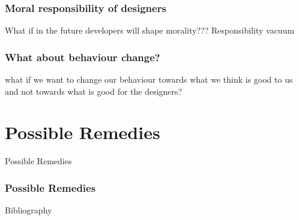 \documentclass{beamer}
\begin{document}
\begin{frame}
	\frametitle{Moral responsibility of designers}
	What if in the future developers will shape morality??? Responsibility vacuum	
\end{frame}

\begin{frame}
\frametitle{What about behaviour change?}
what if we want to change our behaviour towards what we think is good to us and not towards what is good for the designers?
\end{frame}

\section{Possible Remedies}
\begin{frame}
\begin{center} 
	 Possible Remedies
\end{center}
\end{frame}

\begin{frame}
\frametitle{Possible Remedies}
\end{frame}

\nocite{*}
\begin{frame}{Bibliography}
\renewcommand*{\bibfont}{\small}
\printbibliography
\end{frame}
\end{document}
